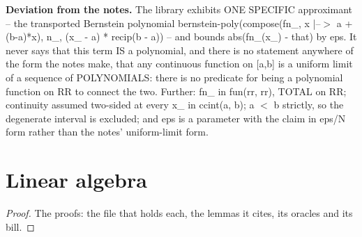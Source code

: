 %
\noindent\textbf{Deviation from the notes.} The library exhibits ONE SPECIFIC approximant -- the transported Bernstein polynomial bernstein-poly(compose(fn\_, x |--$>$ a + (b-a)*x), n\_, (x\_ - a) * recip(b - a)) -- and bounds abs(fn\_(x\_) - that) by eps. It never says that this term IS a polynomial, and there is no statement anywhere of the form the notes make, that any continuous function on [a,b] is a uniform limit of a sequence of POLYNOMIALS: there is no predicate for being a polynomial function on RR to connect the two. Further: fn\_ in fun(rr, rr), TOTAL on RR; continuity assumed two-sided at every x\_ in ccint(a, b); a $<$ b strictly, so the degenerate interval is excluded; and eps is a parameter with the claim in eps/N form rather than the notes' uniform-limit form.
%
\section{Linear algebra}
%
\renewcommand{\thethm}{3.3}
\begin{lem}\label{thm:matunit-col-shift}
%
%
\end{lem}
%
\begin{proof}
%
The proofs: the file that holds each, the lemmas it cites, its oracles and its bill.
%
%
%
%
\end{proof}
